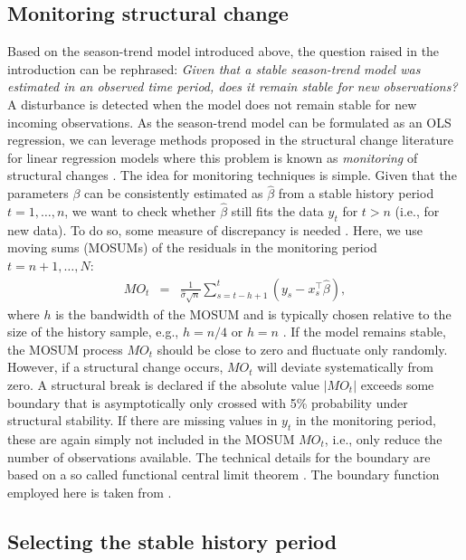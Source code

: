 \documentclass[authoryear,preprint,review,10pt]{elsarticle}
\begin{document}
\subsection{Monitoring structural change}\label{sec:MonStrucChange}

Based on the season-trend model introduced above, the question raised in
the introduction can be rephrased: \emph{Given that a stable season-trend model was estimated in an observed
time period, does it remain stable for new observations?} A disturbance is detected when the model does not remain stable for new incoming observations.
As the season-trend model can be formulated as an OLS regression,
we can leverage methods proposed in the structural change literature
for linear regression models where this problem is known as \emph{monitoring}
of structural changes \citep{Chu1996}.
The idea for monitoring techniques is simple. Given that the parameters
$\beta$ can be consistently estimated as $\hat \beta$ from a stable history
period $t = 1, \dots, n$, we want to check whether $\hat \beta$ still fits
the data $y_t$ for $t > n$ (i.e., for new data). To do so, some measure of discrepancy is needed \citep[][]{Chu1996, Leisch2000, Zeileis2005a}. Here, we use moving sums (MOSUMs) of the residuals in the monitoring
period $t = n + 1, \dots, N$:
%
\begin{eqnarray}
  MO_t & = & \frac{1}{\hat \sigma \sqrt{n}} \sum_{s = t - h + 1}^t (y_s - x_s^\top \hat \beta),
\end{eqnarray}
%
where $h$ is the bandwidth of the MOSUM and is typically chosen relative to
the size of the history sample, e.g., $h = n/4$ or $h = n$ \citep{Zeileis2005a, Zeileis:2010tt}.
If the model remains stable, the MOSUM process $MO_t$ should be close to zero and
fluctuate only randomly. However, if a structural change occurs, $MO_t$ will deviate
systematically from zero. A structural break is declared if the absolute value
$|MO_t|$ exceeds some boundary that is asymptotically only crossed with 5\%
probability under structural stability. 
If there are missing values in $y_t$ in the monitoring period, these are 
again simply not included in the MOSUM $MO_t$, i.e., only reduce the number 
of observations available. The technical details for the boundary are based
on a so called functional central limit theorem \citep[see][for details]{Leisch2000}.
The boundary function employed here is taken from \citet[Eq.~7]{Zeileis2005b}.

\subsection{Selecting the stable history period}\label{sec:StableHist}
\end{document}
